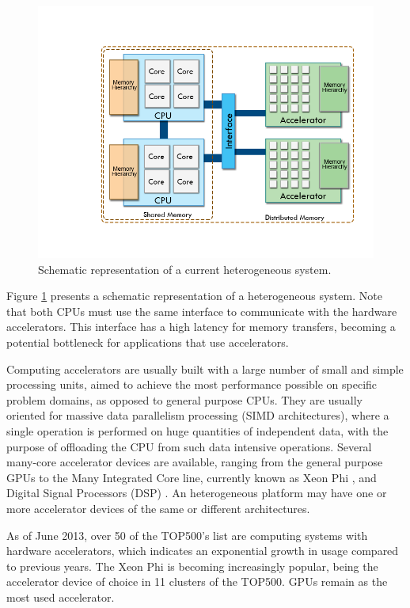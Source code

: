 \begin{figure}[!htp]
	\begin{center}
		\includegraphics[scale=0.4]{../../common/img/hetplats2.png}
		\caption{Schematic representation of a current heterogeneous system.}
		\label{fig:HeterogeneousSystem}
	\end{center}
\end{figure}

Figure \ref{fig:HeterogeneousSystem} presents a schematic representation of a heterogeneous system. Note that both CPUs must use the same interface to communicate with the hardware accelerators. This interface has a high latency for memory transfers, becoming a potential bottleneck for applications that use accelerators.

Computing accelerators are usually built with a large number of small and simple processing units, aimed to achieve the most performance possible on specific problem domains, as opposed to general purpose CPUs. They are usually oriented for massive data parallelism processing (SIMD architectures), where a single operation is performed on huge quantities of independent data, with the purpose of offloading the CPU from such data intensive operations. Several many-core accelerator devices are available, ranging from the general purpose GPUs to the \intel Many Integrated Core line, currently known as \intel Xeon Phi \cite{Intel:MIC}, and Digital Signal Processors (DSP) \cite{Texas:DSP}. An heterogeneous platform may have one or more accelerator devices of the same or different architectures.

As of June 2013, over 50 of the TOP500’s list \cite{TOP500} are computing systems with hardware accelerators, which indicates an exponential growth in usage compared to previous years. The \intel Xeon Phi is becoming increasingly popular, being the accelerator device of choice in 11 clusters of the TOP500. \nvidia GPUs remain as the most used accelerator.

